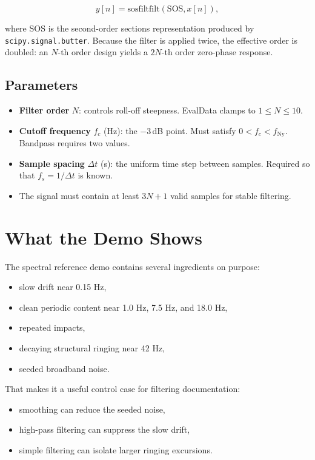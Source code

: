 \documentclass[11pt,a4paper]{article}
\begin{document}
\[
y[n] = \mathrm{sosfiltfilt}(\mathrm{SOS}, x[n]),
\]

where $\mathrm{SOS}$ is the second-order sections representation produced by \texttt{scipy.signal.butter}. Because the filter is applied twice, the effective order is doubled: an $N$-th order design yields a $2N$-th order zero-phase response.

\subsection{Parameters}

\begin{itemize}
    \item \textbf{Filter order} $N$: controls roll-off steepness. EvalData clamps to $1 \le N \le 10$.
    \item \textbf{Cutoff frequency} $f_c$ (Hz): the $-3$\,dB point. Must satisfy $0 < f_c < f_{\mathrm{Ny}}$. Bandpass requires two values.
    \item \textbf{Sample spacing} $\Delta t$ (s): the uniform time step between samples. Required so that $f_s = 1/\Delta t$ is known.
    \item The signal must contain at least $3N + 1$ valid samples for stable filtering.
\end{itemize}

\section{What the Demo Shows}

The spectral reference demo contains several ingredients on purpose:

\begin{itemize}
    \item slow drift near 0.15 Hz,
    \item clean periodic content near 1.0 Hz, 7.5 Hz, and 18.0 Hz,
    \item repeated impacts,
    \item decaying structural ringing near 42 Hz,
    \item seeded broadband noise.
\end{itemize}

That makes it a useful control case for filtering documentation:

\begin{itemize}
    \item smoothing can reduce the seeded noise,
    \item high-pass filtering can suppress the slow drift,
    \item simple filtering can isolate larger ringing excursions.
\end{itemize}
\end{document}
